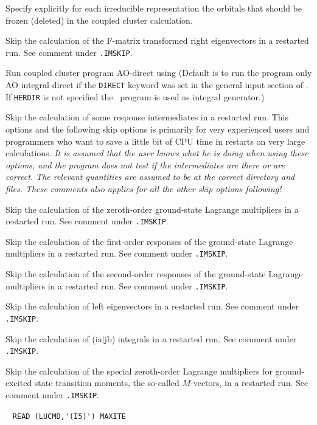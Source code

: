 \begin{description}
    Specify explicitly for each irreducible representation the
    orbitals that should be frozen (deleted) in the coupled cluster
    calculation.
 
\item[\Key{FRSKIP}] 
   Skip the calculation of the F-matrix transformed right eigenvectors
   in a restarted run. See comment under \verb|.IMSKIP|.
%
\item[\Key{HERDIR}] 
       Run coupled cluster program AO-direct
       using {\her}
       (Default is to run the program only AO integral direct
       if the \verb+DIRECT+ keyword was set in the general
       input section of \siraba . If \verb+HERDIR+ is not specified the \eri\
       program is used as integral generator.) 
%
\item[\Key{IMSKIP}] 
   Skip the calculation of some response intermediates in a restarted run.
   This options and the following skip options is primarily for very experienced users 
   and programmers who want to save a little bit of CPU time in restarts on very large 
   calculations. 
   {\em It is assumed that the user knows what he is doing when using these options, and
   the program does not test if the intermediates are there or are correct. 
   The relevant quantities are assumed to be at the correct directory and files.
   These comments also applies for all the other skip options following! }
%
\item[\Key{L0SKIP}]  
   Skip the calculation of the zeroth-order ground-state Lagrange
   multipliers in a restarted run. See comment under \verb|.IMSKIP|.
%
\item[\Key{L1SKIP}] 
   Skip the calculation of the first-order responses of the 
   ground-state Lagrange multipliers in a restarted run. See comment under \verb|.IMSKIP|.
%
\item[\Key{L2SKIP}]  
   Skip the calculation of the second-order responses of the 
   ground-state Lagrange multipliers in a restarted run. See comment under \verb|.IMSKIP|.
%
\item[\Key{LESKIP}]  
   Skip the calculation of left eigenvectors
   in a restarted run. See comment under \verb|.IMSKIP|.
%
\item[\Key{LISKIP}] 
   Skip the calculation of (ia$\mid$jb) integrals in a restarted run. See comment under \verb|.IMSKIP|.
%
\item[\Key{M1SKIP}] 
   Skip the calculation of the special zeroth-order Lagrange 
   multipliers for ground-excited state transition moments,
   the so-called $M$-vectors, in a restarted run. See comment under \verb|.IMSKIP|.
%
\item[\Key{MAX IT}] \verb| |\newline
  \verb|READ (LUCMD,'(I5)') MAXITE|


\end{description}
